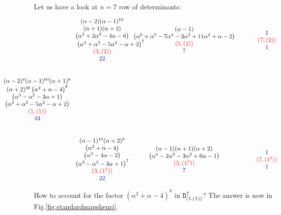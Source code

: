 {\mdef {}
Let us have a look at $n=7$ row of determinants:
\[ \hspace{-2cm} 
\begin{tikzcd}
&
\baa{
(\alpha -2) (\alpha -1)^{10} \\ (\alpha +1) (\alpha +2) \\\left(\alpha ^3+2 \alpha ^2-4 \alpha -6\right) \\\left(\alpha ^4+\alpha ^3-5 \alpha ^2-\alpha +2\right)^7  \hspace{-1cm} \\ \ppm{(3,(2))}\\\bajm{22}
}    \hspace{-1cm} 
&
\baa{(\alpha -1) \\
\left(\alpha ^6+\alpha ^5-7 \alpha ^4-3 \alpha ^3+11 \alpha ^2+\alpha -2\right)\\\ppm{(5,(2))}\\\bajm{7}
}
&
\baa{1\\\ppm{(7,(2))}\\\bajm{1}
}
\\
\baa{
(\alpha -2)^8 (\alpha -1)^{60} (\alpha +1)^8\\ (\alpha +2)^{30} \left(\alpha ^2+\alpha -4\right)^8 \\\left(\alpha ^3-\alpha ^2-3 \alpha +1\right) \\\left(\alpha ^4+\alpha ^3-5 \alpha ^2-\alpha +2\right)\\\ppm{(1,(1))}\\\bajm{43}
}  \hspace{-1cm} 
\\
&
\baa{(\alpha -1)^{10} (\alpha +2)^8 \\ \left(\alpha ^2+\alpha -4\right)\\ \left(\alpha ^3-4 \alpha -2\right) \\ \left(\alpha ^3-\alpha ^2-3 \alpha +1\right)^7 \\ \ppm{(3,(1^2))}\\\bajm{22}
}  \hspace{-1cm} 
&
\baa{(\alpha -1) (\alpha +1) (\alpha +2)\\
\left(\alpha ^4-2 \alpha ^3-3 \alpha ^2+6 \alpha -1\right)\\\ppm{(5,(1^2))}\\\bajm{7}
}
&
\baa{1\\\ppm{(7,(1^2))}\\\bajm{1}
}
\end{tikzcd}\]
How to account for the factor $\left(\alpha ^2+\alpha -4\right)^8$ in ${\mathtt D}^{7}_{(1,(1))}$? 
The answer is now in Fig.\ref{fig:standardmapshenri}. 

\medskip }

